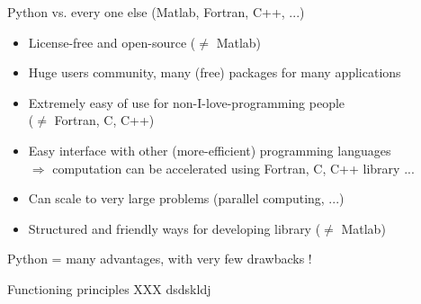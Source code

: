 \documentclass[11pt,unknownkeysallowed,usenames,dvipsnames]{beamer}
\begin{document}
	\begin{frame}{Python vs. every one else (Matlab, Fortran, C++, ...)}
        \begin{itemize}
            \item License-free and open-source ($\neq$ Matlab)
            \item Huge users community, many (free) packages for many applications
            \item Extremely easy of use for non-I-love-programming people \\ ($\neq$ Fortran, C, C++)
            \item Easy interface with other (more-efficient) programming languages \\
            $\Rightarrow$ computation can be accelerated using Fortran, C, C++
            library ... 
            \item Can scale to very large problems (parallel computing, ...)
            \item Structured and friendly ways for developing library ($\neq$ Matlab)
        \end{itemize}
	
		\vspace{10pt}
	
		\begin{center}
            Python = many advantages, with very few drawbacks !
        \end{center}
	\end{frame}
    
	\begin{frame}{Functioning principles}
        XXX dsdskldj
        
    \end{frame}
\end{document}
